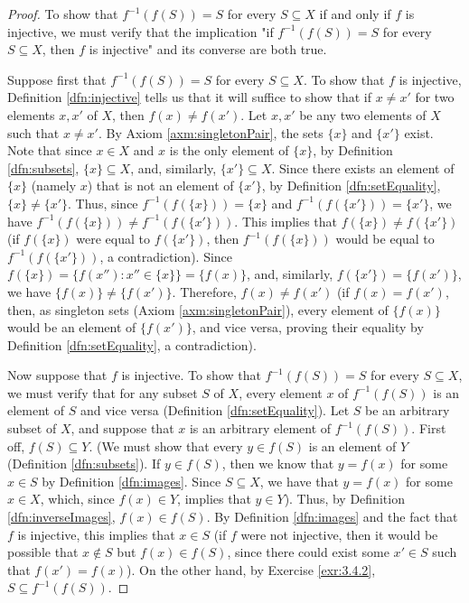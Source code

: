 \documentclass[../main.tex]{subfiles}
\begin{document}
\begin{enumerate}[ref={\thesection.\arabic*}]
\begin{proof}
        To show that $f^{-1}(f(S))=S$ for every $S\subseteq X$ if and only if $f$ is injective, we must verify that the implication "if $f^{-1}(f(S))=S$ for every $S\subseteq X$, then $f$ is injective" and its converse are both true.\par
        Suppose first that $f^{-1}(f(S))=S$ for every $S\subseteq X$. To show that $f$ is injective, Definition \ref{dfn:injective} tells us that it will suffice to show that if $x\neq x'$ for two elements $x,x'$ of $X$, then $f(x)\neq f(x')$. Let $x,x'$ be any two elements of $X$ such that $x\neq x'$. By Axiom \ref{axm:singletonPair}, the sets $\{x\}$ and $\{x'\}$ exist. Note that since $x\in X$ and $x$ is the only element of $\{x\}$, by Definition \ref{dfn:subsets}, $\{x\}\subseteq X$, and, similarly, $\{x'\}\subseteq X$. Since there exists an element of $\{x\}$ (namely $x$) that is not an element of $\{x'\}$, by Definition \ref{dfn:setEquality}, $\{x\}\neq\{x'\}$. Thus, since $f^{-1}(f(\{x\}))=\{x\}$ and $f^{-1}(f(\{x'\}))=\{x'\}$, we have $f^{-1}(f(\{x\}))\neq f^{-1}(f(\{x'\}))$. This implies that $f(\{x\})\neq f(\{x'\})$ (if $f(\{x\})$ were equal to $f(\{x'\})$, then $f^{-1}(f(\{x\}))$ would be equal to $f^{-1}(f(\{x'\}))$, a contradiction). Since $f(\{x\})=\{f(x''):x''\in\{x\}\}=\{f(x)\}$, and, similarly, $f(\{x'\})=\{f(x')\}$, we have $\{f(x)\}\neq\{f(x')\}$. Therefore, $f(x)\neq f(x')$ (if $f(x)=f(x')$, then, as singleton sets (Axiom \ref{axm:singletonPair}), every element of $\{f(x)\}$ would be an element of $\{f(x')\}$, and vice versa, proving their equality by Definition \ref{dfn:setEquality}, a contradiction).\par
        Now suppose that $f$ is injective. To show that $f^{-1}(f(S))=S$ for every $S\subseteq X$, we must verify that for any subset $S$ of $X$, every element $x$ of $f^{-1}(f(S))$ is an element of $S$ and vice versa (Definition \ref{dfn:setEquality}). Let $S$ be an arbitrary subset of $X$, and suppose that $x$ is an arbitrary element of $f^{-1}(f(S))$. First off, $f(S)\subseteq Y$. (We must show that every $y\in f(S)$ is an element of $Y$ (Definition \ref{dfn:subsets}). If $y\in f(S)$, then we know that $y=f(x)$ for some $x\in S$ by Definition \ref{dfn:images}. Since $S\subseteq X$, we have that $y=f(x)$ for some $x\in X$, which, since $f(x)\in Y$, implies that $y\in Y$). Thus, by Definition \ref{dfn:inverseImages}, $f(x)\in f(S)$. By Definition \ref{dfn:images} and the fact that $f$ is injective, this implies that $x\in S$ (if $f$ were not injective, then it would be possible that $x\notin S$ but $f(x)\in f(S)$, since there could exist some $x'\in S$ such that $f(x')=f(x)$). On the other hand, by Exercise \ref{exr:3.4.2}, $S\subseteq f^{-1}(f(S))$.

\end{proof}
\end{enumerate}
\end{document}
